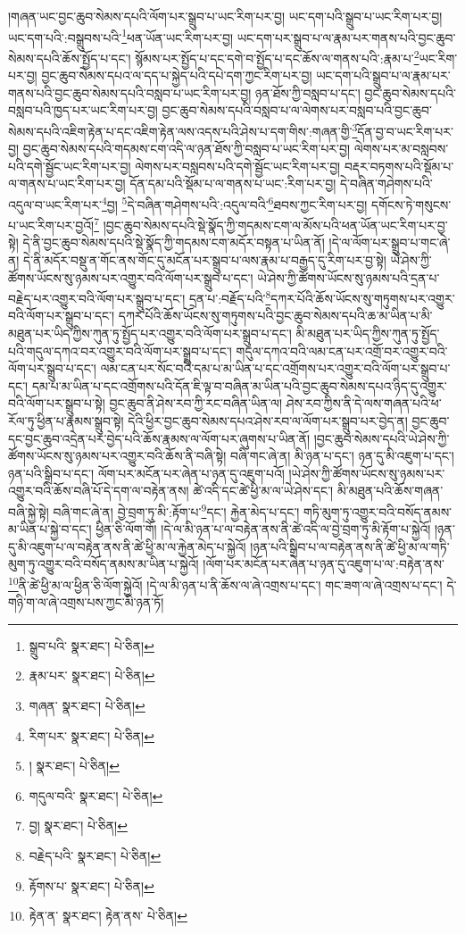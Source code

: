 །གཞན་ཡང་བྱང་ཆུབ་སེམས་དཔའི་ལོག་པར་སྒྲུབ་པ་ཡང་རིག་པར་བྱ། ཡང་དག་པའི་སྒྲུབ་པ་ཡང་རིག་པར་བྱ། ཡང་དག་པའི་:བསྒྲུབས་པའི་\footnote{སྒྲུབ་པའི་  སྣར་ཐང་།  པེ་ཅིན། }ཕན་ཡོན་ཡང་རིག་པར་བྱ། ཡང་དག་པར་སྒྲུབ་པ་ལ་རྣམ་པར་གནས་པའི་བྱང་ཆུབ་སེམས་དཔའི་ཆོས་སྤྱོད་པ་དང་། སྙོམས་པར་སྤྱོད་པ་དང་དགེ་བ་སྤྱོད་པ་དང་ཆོས་ལ་གནས་པའི་:རྣམ་པ་\footnote{རྣམ་པར་  སྣར་ཐང་།  པེ་ཅིན། }ཡང་རིག་པར་བྱ། བྱང་ཆུབ་སེམས་དཔའ་ལ་དད་པ་སྐྱེད་པའི་དཔེ་དག་ཀྱང་རིག་པར་བྱ། ཡང་དག་པའི་སྒྲུབ་པ་ལ་རྣམ་པར་གནས་པའི་བྱང་ཆུབ་སེམས་དཔའི་བསླབ་པ་ཡང་རིག་པར་བྱ། ཉན་ཐོས་ཀྱི་བསླབ་པ་དང་། བྱང་ཆུབ་སེམས་དཔའི་བསླབ་པའི་ཁྱད་པར་ཡང་རིག་པར་བྱ། བྱང་ཆུབ་སེམས་དཔའི་བསླབ་པ་ལ་ལེགས་པར་བསླབ་པའི་བྱང་ཆུབ་སེམས་དཔའི་འཇིག་རྟེན་པ་དང་འཇིག་རྟེན་ལས་འདས་པའི་ཤེས་པ་དག་གིས་:གཞན་གྱི་\footnote{གཞན་  སྣར་ཐང་།  པེ་ཅིན། }དོན་བྱ་བ་ཡང་རིག་པར་བྱ། བྱང་ཆུབ་སེམས་དཔའི་གདམས་ངག་འདི་ལ་ཉན་ཐོས་ཀྱི་བསླབ་པ་ཡང་རིག་པར་བྱ། ལེགས་པར་མ་བསླབས་པའི་དགེ་སྦྱོང་ཡང་རིག་པར་བྱ། ལེགས་པར་བསླབས་པའི་དགེ་སྦྱོང་ཡང་རིག་པར་བྱ། བརྡར་བཏགས་པའི་སྡོམ་པ་ལ་གནས་པ་ཡང་རིག་པར་བྱ། དོན་དམ་པའི་སྡོམ་པ་ལ་གནས་པ་ཡང་:རིག་པར་བྱ། དེ་བཞིན་གཤེགས་པའི་འདུལ་བ་ཡང་རིག་པར་\footnote{རིག་པར་  སྣར་ཐང་།  པེ་ཅིན། }བྱ། \footnote{།    སྣར་ཐང་།  པེ་ཅིན། }དེ་བཞིན་གཤེགས་པའི་:འདུལ་བའི་\footnote{གདུལ་བའི་  སྣར་ཐང་།  པེ་ཅིན། }ཐབས་ཀྱང་རིག་པར་བྱ། དགོངས་ཏེ་གསུངས་པ་ཡང་རིག་པར་བྱའོ།\footnote{བྱ།  སྣར་ཐང་།  པེ་ཅིན། } །བྱང་ཆུབ་སེམས་དཔའི་སྡེ་སྣོད་ཀྱི་གདམས་ངག་ལ་མོས་པའི་ཕན་ཡོན་ཡང་རིག་པར་བྱ་སྟེ། དེ་ནི་བྱང་ཆུབ་སེམས་དཔའི་སྡེ་སྣོད་ཀྱི་གདམས་ངག་མདོར་བསྟན་པ་ཡིན་ནོ། །དེ་ལ་ལོག་པར་སྒྲུབ་པ་གང་ཞེ་ན། དེ་ནི་མདོར་བསྡུ་ན་གོང་ནས་གོང་དུ་མངོན་པར་སྒྲུབ་པ་ལས་རྣམ་པ་བརྒྱད་དུ་རིག་པར་བྱ་སྟེ། ཡེ་ཤེས་ཀྱི་ཚོགས་ཡོངས་སུ་ཉམས་པར་འགྱུར་བའི་ལོག་པར་སྒྲུབ་པ་དང་། ཡེ་ཤེས་ཀྱི་ཚོགས་ཡོངས་སུ་ཉམས་པའི་དྲན་པ་བརྗེད་པར་འགྱུར་བའི་ལོག་པར་སྒྲུབ་པ་དང་། དྲན་པ་:བརྗོད་པའི་\footnote{བརྗེད་པའི་  སྣར་ཐང་།  པེ་ཅིན། }དཀར་པོའི་ཆོས་ཡོངས་སུ་གཏུགས་པར་འགྱུར་བའི་ལོག་པར་སྒྲུབ་པ་དང་། དཀར་པོའི་ཆོས་ཡོངས་སུ་གཏུགས་པའི་བྱང་ཆུབ་སེམས་དཔའི་ཆ་མ་ཡིན་པ་མི་མཐུན་པར་ཡིད་ཀྱིས་ཀུན་ཏུ་སྤྱོད་པར་འགྱུར་བའི་ལོག་པར་སྒྲུབ་པ་དང་། མི་མཐུན་པར་ཡིད་ཀྱིས་ཀུན་ཏུ་སྤྱོད་པའི་གདུལ་དཀའ་བར་འགྱུར་བའི་ལོག་པར་སྒྲུབ་པ་དང་། གདུལ་དཀའ་བའི་ལམ་ངན་པར་འགྲོ་བར་འགྱུར་བའི་ལོག་པར་སྒྲུབ་པ་དང་། ལམ་ངན་པར་སོང་བའི་དམ་པ་མ་ཡིན་པ་དང་འགྲོགས་པར་འགྱུར་བའི་ལོག་པར་སྒྲུབ་པ་དང་། དམ་པ་མ་ཡིན་པ་དང་འགྲོགས་པའི་དོན་ཇི་ལྟ་བ་བཞིན་མ་ཡིན་པའི་བྱང་ཆུབ་སེམས་དཔའ་ཉིད་དུ་འགྱུར་བའི་ལོག་པར་སྒྲུབ་པ་སྟེ། བྱང་ཆུབ་ནི་ཤེས་རབ་ཀྱི་རང་བཞིན་ཡིན་ལ། ཤེས་རབ་ཀྱིས་ནི་དེ་ལས་གཞན་པའི་ཕ་རོལ་ཏུ་ཕྱིན་པ་རྣམས་སྒྲུབ་སྟེ། དེའི་ཕྱིར་བྱང་ཆུབ་སེམས་དཔའ་ཤེས་རབ་ལ་ལོག་པར་སྒྲུབ་པར་བྱེད་ན། བྱང་ཆུབ་དང་བྱང་ཆུབ་འདྲེན་པར་བྱེད་པའི་ཆོས་རྣམས་ལ་ལོག་པར་ཞུགས་པ་ཡིན་ནོ། །བྱང་ཆུབ་སེམས་དཔའི་ཡེ་ཤེས་ཀྱི་ཚོགས་ཡོངས་སུ་ཉམས་པར་འགྱུར་བའི་ཆོས་ནི་བཞི་སྟེ། བཞི་གང་ཞེ་ན། མི་ཉན་པ་དང་། ཉན་དུ་མི་འཇུག་པ་དང་། ཉན་པའི་སྒྲིབ་པ་དང་། ལོག་པར་མངོན་པར་ཞེན་པ་ཉན་དུ་འཇུག་པའོ། །ཡེ་ཤེས་ཀྱི་ཚོགས་ཡོངས་སུ་ཉམས་པར་འགྱུར་བའི་ཆོས་བཞི་པོ་དེ་དག་ལ་བརྟེན་ནས། ཚེ་འདི་དང་ཚེ་ཕྱི་མ་ལ་ཡེ་ཤེས་དང་། མི་མཐུན་པའི་ཆོས་གཞན་བཞི་སྐྱེ་སྟེ། བཞི་གང་ཞེ་ན། བྱེ་བྲག་ཏུ་མི་:རྟོག་པ་\footnote{རྟོགས་པ་  སྣར་ཐང་།  པེ་ཅིན། }དང་། རྐྱེན་མེད་པ་དང་། གཏི་མུག་ཏུ་འགྱུར་བའི་བསོད་ནམས་མ་ཡིན་པ་སྐྱེ་བ་དང་། ཕྱིན་ཅི་ལོག་གོ། །དེ་ལ་མི་ཉན་པ་ལ་བརྟེན་ནས་ནི་ཚེ་འདི་ལ་བྱེ་བྲག་ཏུ་མི་རྟོག་པ་སྐྱེའོ། །ཉན་དུ་མི་འཇུག་པ་ལ་བརྟེན་ནས་ནི་ཚེ་ཕྱི་མ་ལ་རྐྱེན་མེད་པ་སྐྱེའོ། །ཉན་པའི་སྒྲིབ་པ་ལ་བརྟེན་ནས་ནི་ཚེ་ཕྱི་མ་ལ་གཏི་མུག་ཏུ་འགྱུར་བའི་བསོད་ནམས་མ་ཡིན་པ་སྐྱེའོ། །ལོག་པར་མངོན་པར་ཞེན་པ་ཉན་དུ་འཇུག་པ་ལ་:བརྟེན་ནས་\footnote{རྟེན་ན་  སྣར་ཐང་། རྟེན་ནས་  པེ་ཅིན། }ནི་ཚེ་ཕྱི་མ་ལ་ཕྱིན་ཅི་ལོག་སྐྱེའོ། །དེ་ལ་མི་ཉན་པ་ནི་ཆོས་ལ་ཞེ་འགྲས་པ་དང་། གང་ཟག་ལ་ཞེ་འགྲས་པ་དང་། དེ་གཉི་ག་ལ་ཞེ་འགྲས་པས་ཀྱང་མི་ཉན་ཏོ། 